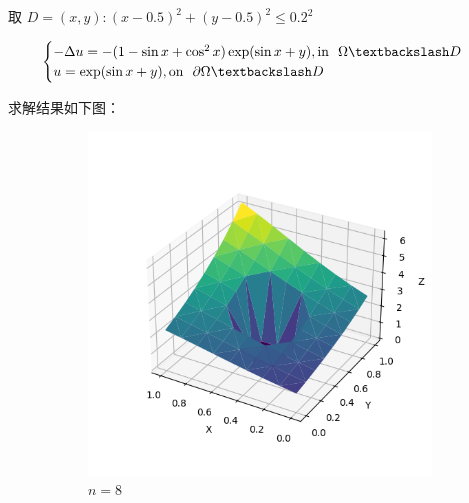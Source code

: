 \documentclass[lang=cn,a4paper,newtx,bibend=bibtex]{elegantpaper}
\begin{document}

取 $D = {(x, y) : (x - 0.5)^2 + (y - 0.5)^2 \le 0.2^2}$

\[
  \begin{cases}
    - \Delta u = -(1 - \sin x + \cos^2 x) \exp(\sin x + y), \text{in~~} \Omega \fxg D \\
    u = \exp(\sin x + y), \text{on~~} \partial \Omega \fxg D \\
  \end{cases}
\]

求解结果如下图：

\begin{figure}[H]
  \centering
  \begin{subfigure}[b]{0.18\textwidth}
      \includegraphics[width=\textwidth]{../../res_bac/res-[data|1-Dirichlet-irregular-a8].png}
      \caption{$n =  8$}
  \end{subfigure}
  \hfill
  \begin{subfigure}[b]{0.18\textwidth}

\end{subfigure}
\end{figure}
\end{document}
